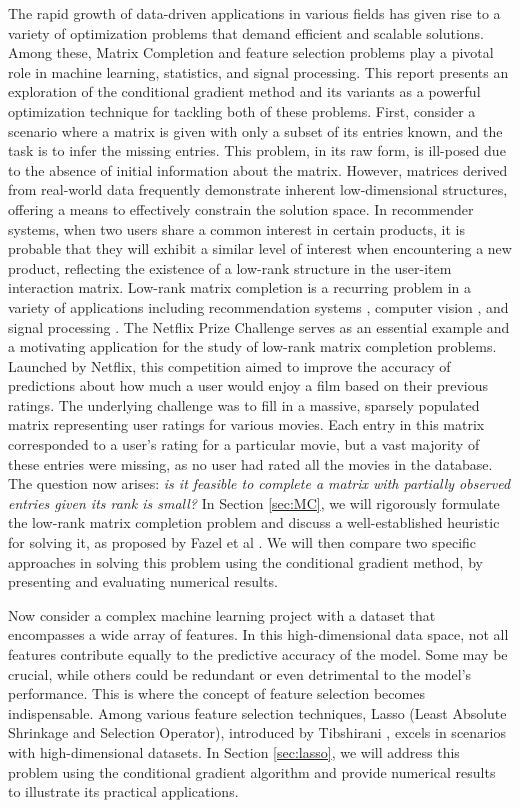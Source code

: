 \documentclass[10pt, twocolumn, reqno, a4paper,oneside]{amsart}
\numberwithin{equation}{section}
\numberwithin{theorem}{section}
\numberwithin{figure}{section}
\numberwithin{table}{section}
\numberwithin{theorem}{section}
\numberwithin{equation}{section}
\begin{document}
The rapid growth of data-driven applications in various fields has given rise to a variety of optimization problems that demand efficient and scalable solutions. Among these, Matrix Completion and feature selection problems play a pivotal role in machine learning, statistics, and signal processing. This report presents an exploration of the conditional gradient method and its variants as a powerful optimization technique for tackling both of these problems.
First, consider a scenario where a matrix is given with only a subset of its entries known, and the task is to infer the missing entries. This problem, in its raw form, is ill-posed due to the absence of initial information about the matrix. However, matrices derived from real-world data frequently demonstrate inherent low-dimensional structures, offering a means to effectively constrain the solution space.
In recommender systems, when two users share a common interest in certain products, it is probable that they will exhibit a similar level of interest when encountering a new product, reflecting the existence of a low-rank structure in the user-item interaction matrix.
Low-rank matrix completion is a recurring problem in a variety of applications including recommendation systems \cite{6389682}, computer vision \cite{8265431}, and signal processing \cite{Li2019ASO}. The Netflix Prize Challenge \cite{Bennett2007TheNP} serves as an essential example and a motivating application for the study of low-rank matrix completion problems. Launched by Netflix, this competition aimed to improve the accuracy of predictions about how much a user would enjoy a film based on their previous ratings. The underlying challenge was to fill in a massive, sparsely populated matrix representing user ratings for various movies. Each entry in this matrix corresponded to a user's rating for a particular movie, but a vast majority of these entries were missing, as no user had rated all the movies in the database.  The question now arises: \textit {is it feasible to complete a matrix with partially observed entries given its rank is small?} In Section \ref{sec:MC}, we will rigorously formulate the low-rank matrix completion problem and discuss a well-established heuristic for solving it, as proposed by Fazel et al \cite{Fazel2002MatrixRank}. We will then compare two specific approaches in solving this problem using the conditional gradient method, by presenting and evaluating numerical results.

Now consider a complex machine learning project with a dataset that encompasses a wide array of features. In this high-dimensional data space, not all features contribute equally to the predictive accuracy of the model. Some may be crucial, while others could be redundant or even detrimental to the model's performance. This is where the concept of feature selection becomes indispensable. Among various feature selection techniques, Lasso (Least Absolute Shrinkage and Selection Operator), introduced by Tibshirani \cite{tibshirani1996regression}, excels in scenarios with high-dimensional datasets. In Section \ref{sec:lasso}, we will address this problem using the conditional gradient algorithm and provide numerical results to illustrate its practical applications.
\end{document}
